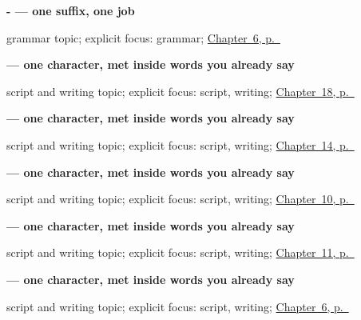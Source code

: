 \noindent\begin{minipage}[t]{\linewidth}
\raggedright
\textbf{- — one suffix, one job}\par
\footnotesize grammar topic; explicit focus: grammar; \hyperref[ch:ka-dative-case]{Chapter~6, p.~\pageref*{ch:ka-dative-case}}
\end{minipage}\par\smallskip

\noindent\begin{minipage}[t]{\linewidth}
\raggedright
\textbf{ — one character, met inside words you already say}\par
\footnotesize script and writing topic; explicit focus: script, writing; \hyperref[ch:ka-telling-time]{Chapter~18, p.~\pageref*{ch:ka-telling-time}}
\end{minipage}\par\smallskip

\noindent\begin{minipage}[t]{\linewidth}
\raggedright
\textbf{ — one character, met inside words you already say}\par
\footnotesize script and writing topic; explicit focus: script, writing; \hyperref[ch:ka-seasons]{Chapter~14, p.~\pageref*{ch:ka-seasons}}
\end{minipage}\par\smallskip

\noindent\begin{minipage}[t]{\linewidth}
\raggedright
\textbf{ — one character, met inside words you already say}\par
\footnotesize script and writing topic; explicit focus: script, writing; \hyperref[ch:ka-days-of-the-week]{Chapter~10, p.~\pageref*{ch:ka-days-of-the-week}}
\end{minipage}\par\smallskip

\noindent\begin{minipage}[t]{\linewidth}
\raggedright
\textbf{ — one character, met inside words you already say}\par
\footnotesize script and writing topic; explicit focus: script, writing; \hyperref[ch:ka-core-colours]{Chapter~11, p.~\pageref*{ch:ka-core-colours}}
\end{minipage}\par\smallskip

\noindent\begin{minipage}[t]{\linewidth}
\raggedright
\textbf{ — one character, met inside words you already say}\par
\footnotesize script and writing topic; explicit focus: script, writing; \hyperref[ch:ka-dative-case]{Chapter~6, p.~\pageref*{ch:ka-dative-case}}
\end{minipage}\par\smallskip

